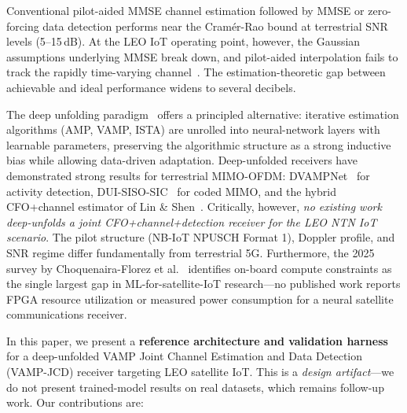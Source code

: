 \documentclass{article}
\begin{document}
Conventional pilot-aided MMSE channel estimation followed by MMSE or zero-forcing data detection performs near the Cram\'er-Rao bound at terrestrial SNR levels (5--15\,dB). At the LEO IoT operating point, however, the Gaussian assumptions underlying MMSE break down, and pilot-aided interpolation fails to track the rapidly time-varying channel~\cite{3gppTR38811}. The estimation-theoretic gap between achievable and ideal performance widens to several decibels.

The deep unfolding paradigm~\cite{gregor2010learning,borgerding2017amp,monga2021algorithm} offers a principled alternative: iterative estimation algorithms (AMP, VAMP, ISTA) are unrolled into neural-network layers with learnable parameters, preserving the algorithmic structure as a strong inductive bias while allowing data-driven adaptation. Deep-unfolded receivers have demonstrated strong results for terrestrial MIMO-OFDM: DVAMPNet~\cite{hou2025dvampnet} for activity detection, DUI-SISO-SIC~\cite{mazumdar2024dui} for coded MIMO, and the hybrid CFO+channel estimator of Lin \& Shen~\cite{lin2024hybrid}. Critically, however, \emph{no existing work deep-unfolds a joint CFO+channel+detection receiver for the LEO NTN IoT scenario}. The pilot structure (NB-IoT NPUSCH Format 1), Doppler profile, and SNR regime differ fundamentally from terrestrial 5G. Furthermore, the 2025 survey by Choquenaira-Florez et al.~\cite{choquenaira2025ml} identifies on-board compute constraints as the single largest gap in ML-for-satellite-IoT research---no published work reports FPGA resource utilization or measured power consumption for a neural satellite communications receiver.

In this paper, we present a \textbf{reference architecture and validation harness} for a deep-unfolded VAMP Joint Channel Estimation and Data Detection (VAMP-JCD) receiver targeting LEO satellite IoT. This is a \emph{design artifact}---we do not present trained-model results on real datasets, which remains follow-up work. Our contributions are:
\end{document}
